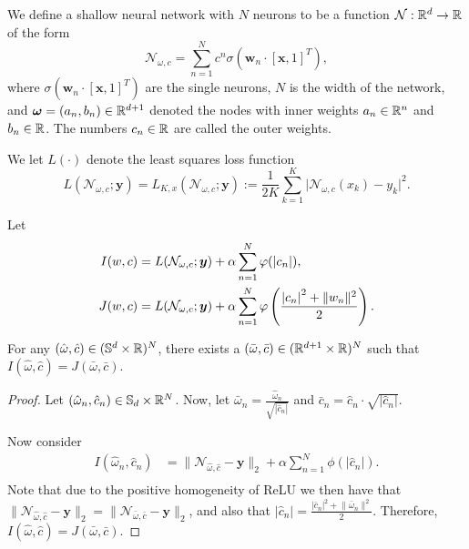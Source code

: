 \documentclass[twoside]{article}
\begin{document}
\begin{definition}
	We define a shallow neural network with $N$ neurons to be a function $\mathcal{N} : \mathbb{R}^{d} \to \mathbb{R}$
	of the form
	\begin{equation*}
		\mathcal{N}_{\omega, c} = \sum_{n=1}^{N}c^{n} \sigma(\bm{w}_{n} \cdot [\bm{x}, 1]^{T}),
	\end{equation*}
	where $\sigma(\bm{w}_{n} \cdot [\bm{x}, 1]^{T})$ are the single neurons, $N$ is the width of the network,
	and $\bm{\omega} = (a_{n}, b_{n}) \in \mathbb{R}^{d + 1}$ denoted the nodes with inner
	weights $a_{n} \in \mathbb{R}^{n}$ and $b_{n} \in \mathbb{R}$. The numbers $c_{n} \in \mathbb{R}$ are called
	the outer weights.
\end{definition}

\begin{definition}
	We let $L(\cdot)$ denote the least squares loss function
	\begin{equation*}
		L(\mathcal{N}_{\omega, c} ; \bm{y}) = L_{K, x}(\mathcal{N}_{\omega, c} ; \bm{y})
		:= \frac{1}{2K}\sum_{k = 1}^{K} \lvert \mathcal{N}_{\omega, c}(x_{k}) - y_{k} \rvert^{2}.
	\end{equation*}
\end{definition}

\begin{lemma}\label{lemma:equality-of-problems}
	Let
	\begin{align*}
		I(w, c) & = L(\mathcal{N}_{\omega, c} ; \bm{y}) + \alpha \sum_{n = 1}^{N} \varphi(\rvert c_{n} \lvert), \\
		J(w, c) & =  L(\mathcal{N}_{\omega, c} ; \bm{y})
		+ \alpha \sum_{n=1}^{N} \varphi\left(\frac{\abs{c_{n}}^{2} + \lVert w_{n} \rVert^{2}}{2}\right).
	\end{align*}

	For any $(\hat{\omega}, \hat{c}) \in (\mathbb{S}^{d} \times \mathbb{R})^{N}$, there exists a
	$(\bar{\omega}, \bar{c}) \in (\mathbb{R}^{d + 1} \times \mathbb{R})^{N}$
	such that $I(\hat{\omega}, \hat{c}) = J(\bar{\omega}, \bar{c})$.
\end{lemma}

\begin{proof}
	Let $(\hat{\omega}_n, \hat{c}_n) \in \mathbb{S}_{d} \times \mathbb{R}^{N}$.
	Now, let $\bar{\omega}_n = \frac{\hat{\omega}_n}{\sqrt{|\hat{c}_n |}}$ and
	$\bar{c}_n = \hat{c}_n \cdot \sqrt{|\hat{c}_n|}$.

	Now consider
	\begin{align*}
		I(\hat{\omega}_n, \hat{c}_n) & = \lVert \mathcal{N}_{\hat{\omega}, \hat{c}} - \bm{y} \rVert_{2}
		+ \alpha \sum_{n = 1}^{N} \phi(|\hat{c}_n|).                                                    \\
	\end{align*}
	Note that due to the positive homogeneity of ReLU we then have that
	$\lVert \mathcal{N}_{\hat{\omega}, \hat{c}} - \bm{y} \rVert_{2} = \lVert \mathcal{N}_{\bar{\omega}, \bar{c}} - \bm{y} \rVert_{2} $,
	and also that $|\hat{c}_n | = \frac{|\bar{c}_n|^2 + \lVert \bar{\omega}_n \rVert^2}{2}$.
	Therefore, $I(\hat{\omega}, \hat{c}) = J(\bar{\omega}, \bar{c})$.

\end{proof}
\end{document}
